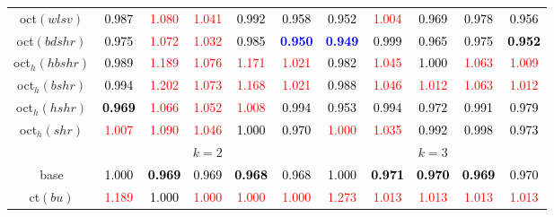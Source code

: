 \begin{tabular}[t]{c|>{}cccc>{}c|ccccc}
oct$(wlsv)$ & \textcolor{black}{0.987} & \textcolor{red}{1.080} & \textcolor{red}{1.041} & \textcolor{black}{0.992} & \textcolor{black}{0.958} & \textcolor{black}{0.952} & \textcolor{red}{1.004} & \textcolor{black}{0.969} & \textcolor{black}{0.978} & \textcolor{black}{0.956}\\
oct$(bdshr)$ & \textcolor{black}{0.975} & \textcolor{red}{1.072} & \textcolor{red}{1.032} & \textcolor{black}{0.985} & \textcolor{blue}{\textbf{0.950}} & \textcolor{blue}{\textbf{0.949}} & \textcolor{black}{0.999} & \textcolor{black}{0.965} & \textcolor{black}{0.975} & \textcolor{black}{\textbf{0.952}}\\
oct$_h(hbshr)$ & \textcolor{black}{0.989} & \textcolor{red}{1.189} & \textcolor{red}{1.076} & \textcolor{red}{1.171} & \textcolor{red}{1.021} & \textcolor{black}{0.982} & \textcolor{red}{1.045} & \textcolor{black}{1.000} & \textcolor{red}{1.063} & \textcolor{red}{1.009}\\
oct$_h(bshr)$ & \textcolor{black}{0.994} & \textcolor{red}{1.202} & \textcolor{red}{1.073} & \textcolor{red}{1.168} & \textcolor{red}{1.021} & \textcolor{black}{0.988} & \textcolor{red}{1.046} & \textcolor{red}{1.012} & \textcolor{red}{1.063} & \textcolor{red}{1.012}\\
oct$_h(hshr)$ & \textcolor{black}{\textbf{0.969}} & \textcolor{red}{1.066} & \textcolor{red}{1.052} & \textcolor{red}{1.008} & \textcolor{black}{0.994} & \textcolor{black}{0.953} & \textcolor{black}{0.994} & \textcolor{black}{0.972} & \textcolor{black}{0.991} & \textcolor{black}{0.979}\\
oct$_h(shr)$ & \textcolor{red}{1.007} & \textcolor{red}{1.090} & \textcolor{red}{1.046} & \textcolor{black}{1.000} & \textcolor{black}{0.970} & \textcolor{red}{1.000} & \textcolor{red}{1.035} & \textcolor{black}{0.992} & \textcolor{black}{0.998} & \textcolor{black}{0.973}\\
\addlinespace[0.3em]
\multicolumn{1}{c}{} & \multicolumn{5}{c}{\textbf{$k = 2$}} & \multicolumn{5}{c}{\textbf{$k = 3$}}\\
base & \textcolor{black}{1.000} & \textcolor{black}{\textbf{0.969}} & \textcolor{black}{0.969} & \textcolor{black}{\textbf{0.968}} & \textcolor{black}{0.968} & \textcolor{black}{1.000} & \textcolor{black}{\textbf{0.971}} & \textcolor{black}{\textbf{0.970}} & \textcolor{black}{\textbf{0.969}} & \textcolor{black}{0.970}\\
ct$(bu)$ & \textcolor{red}{1.189} & \textcolor{black}{1.000} & \textcolor{red}{1.000} & \textcolor{red}{1.000} & \textcolor{red}{1.000} & \textcolor{red}{1.273} & \textcolor{red}{1.013} & \textcolor{red}{1.013} & \textcolor{red}{1.013} & \textcolor{red}{1.013}\\

\end{tabular}
